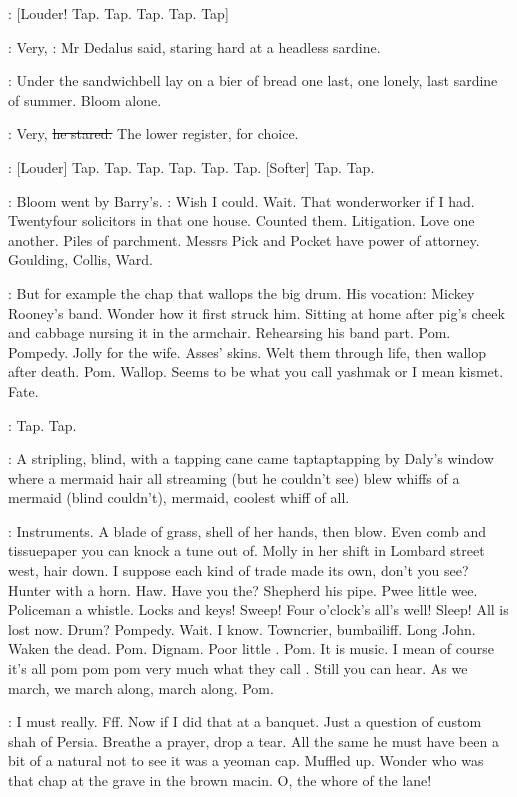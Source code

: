 \stripling:
[Louder!
Tap.
Tap.
Tap.
Tap.
Tap]

\simon:
Very,
:
Mr Dedalus said,
staring hard at a headless sardine.

:
Under the sandwichbell
lay on a bier of bread one last,
one lonely,
last
sardine of summer.
Bloom alone.

\simon:
Very,
\sout{he stared.}
The lower register,
for choice.

\stripling:
[Louder] Tap.
Tap.
Tap.
Tap.
Tap.
Tap.
[Softer] Tap.
Tap.

:
Bloom went by Barry's.
\BloomInt:
Wish I could.
Wait.
That wonderworker if I
had.
Twentyfour solicitors in that one house.
Counted them.
Litigation.
Love one another.
Piles of parchment.
Messrs Pick and Pocket have power
of attorney.
Goulding,
Collis,
Ward.

\BloomInt:
But for example the chap that wallops the big drum.
His vocation:
Mickey Rooney's band.
Wonder how it first struck him.
Sitting at home
after pig's cheek and cabbage nursing it in the armchair.
Rehearsing his
band part.
Pom.
Pompedy.
Jolly for the wife.
Asses' skins.
Welt them
through life,
then wallop after death.
Pom.
Wallop.
Seems to be what you
call yashmak or I mean kismet.
Fate.

\stripling:
Tap.
Tap.

:
A stripling,
blind,
with a tapping cane came taptaptapping
by Daly's window where a mermaid hair all streaming (but he couldn't see)
blew whiffs of a mermaid (blind couldn't),
mermaid,
coolest whiff of all.

\BloomInt:
Instruments.
A blade of grass,
shell of her hands,
then blow.
Even
comb and tissuepaper you can knock a tune out of.
Molly in her shift in
Lombard street west,
hair down.
I suppose each kind of trade made its own,
don't you see?
Hunter with a horn.
Haw.
Have you the?
Shepherd his pipe.
Pwee little wee.
Policeman a whistle.
Locks and keys!
Sweep!
Four o'clock's all's well!
Sleep!
All is lost now.
Drum?
Pompedy.
Wait.
I know.
Towncrier,
bumbailiff.
Long John.
Waken the dead.
Pom.
Dignam.
Poor little .
Pom.
It is music.
I mean of course it's
all pom pom pom very much what they call
.
Still you can hear.
As
we march,
we march along,
march along.
Pom.

\BloomInt:
I must really.
Fff.
Now if I did that at a banquet.
Just a question of
custom shah of Persia.
Breathe a prayer,
drop a tear.
All the same he must
have been a bit of a natural not to see it was a yeoman cap.
Muffled up.
Wonder who was that chap at the grave in the brown macin.
O,
the whore of the lane!

